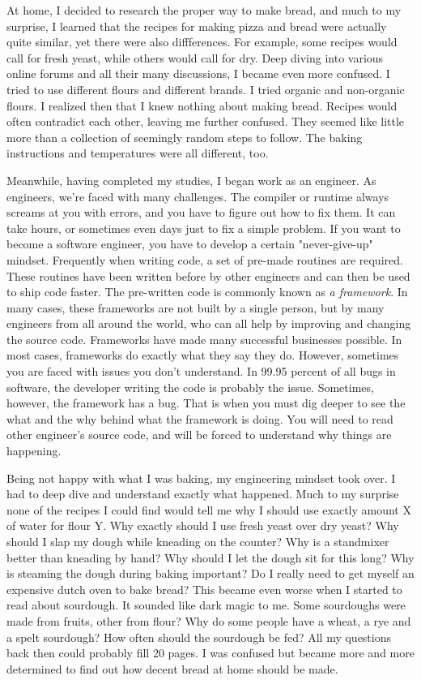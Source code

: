 At home, I decided to research the proper way to make bread, and much to my surprise,
I learned that the recipes for making pizza and bread were actually quite similar, yet
there were also diffferences. For example, some recipes would call for fresh yeast, while
others would call for dry. Deep diving into various online forums and all their many
discussions, I became even more confused.
I tried to use different flours and different brands. I tried organic and non-organic flours.
I realized then that I knew nothing about making bread. Recipes would often contradict each other,
leaving me further confused. They seemed like little more than a collection of seemingly random
steps to follow. The baking instructions and temperatures were all different, too.

Meanwhile, having completed my studies, I began work as an engineer.
As engineers, we're faced with many challenges. The compiler or runtime
always screams at you with errors, and you have to figure out how to fix them.
It can take hours, or sometimes even days just to fix a simple problem. If you want
to become a software engineer, you have to develop a certain "never-give-up" mindset.
Frequently when writing code, a set of pre-made routines are required. These routines have been
written before by other engineers and can then be used to ship code faster.
The pre-written code is commonly known as {\it a framework}. In many cases,
these frameworks are not built by a single person, but by many engineers from all around the world,
who can all help by improving and changing the source code. Frameworks have made many successful
businesses possible. In most cases, frameworks do exactly what they say they do. However,
sometimes you are faced with issues you don't understand. In 99.95 percent
of all bugs in software, the developer writing the code is probably the issue.
Sometimes, however, the framework has a bug. That is when you must dig deeper to
see the what and the why behind what the framework is doing. You will need to read other
engineer's source code, and will be forced to understand why things are happening.

Being not happy with what I was baking, my engineering mindset took over. I had
to deep dive and understand exactly what happened. Much to my surprise none
of the recipes I could find would tell me why I should use exactly amount X
of water for flour Y. Why exactly should I use fresh yeast over dry yeast?
Why should I slap my dough while kneading on the counter? Why is a standmixer
better than kneading by hand?  Why should I let the dough sit for this long?
Why is steaming the dough during baking important? Do I really need to
get myself an expensive dutch oven to bake bread? This became even worse
when I started to read about sourdough. It sounded like dark magic to me.
Some sourdoughs were made from fruits, other from flour? Why do some
people have a wheat, a rye and a spelt sourdough? How often should the sourdough be
fed? All my questions back then could probably fill 20 pages. I was confused
but became more and more determined to find out how decent bread at home
should be made.

